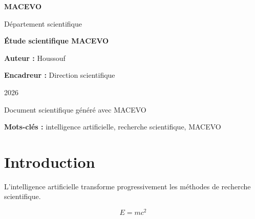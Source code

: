 \documentclass[12pt]{report}
\begin{document}

\begin{titlepage}
\centering

\vspace*{2cm}
{\Large\bfseries MACEVO\par}
\vspace{0.5cm}
{\large Département scientifique\par}
\vspace{2cm}
{\Huge\bfseries Étude scientifique MACEVO\par}
\vspace{1cm}
{\large\textbf{Auteur :} Houssouf\par}
\vspace{0.5cm}
{\large\textbf{Encadreur :} Direction scientifique\par}
\vspace{1cm}
{\large 2026\par}
\vfill
{\large Document scientifique généré avec MACEVO\par}
\end{titlepage}
\cleardoublepage
\begin{abstract}
Ce document présente une étude scientifique générée et structurée avec MACEVO.
\end{abstract}

\noindent\textbf{Mots-clés :} intelligence artificielle, recherche scientifique, MACEVO

\cleardoublepage
\tableofcontents
\cleardoublepage
\chapter{Introduction}

L'intelligence artificielle transforme progressivement les méthodes de recherche scientifique.

\begin{equation}
E = mc^2
\label{eq:energie}
\end{equation}

\end{document}
